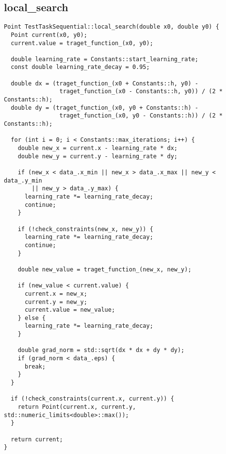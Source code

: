 \documentclass[12pt]{article}
\begin{document}
\subsection{local\_search}
\begin{verbatim}
Point TestTaskSequential::local_search(double x0, double y0) {
  Point current(x0, y0);
  current.value = traget_function_(x0, y0);

  double learning_rate = Constants::start_learning_rate;
  const double learning_rate_decay = 0.95;

  double dx = (traget_function_(x0 + Constants::h, y0) - 
                traget_function_(x0 - Constants::h, y0)) / (2 * Constants::h);
  double dy = (traget_function_(x0, y0 + Constants::h) - 
                traget_function_(x0, y0 - Constants::h)) / (2 * Constants::h);

  for (int i = 0; i < Constants::max_iterations; i++) {
    double new_x = current.x - learning_rate * dx;
    double new_y = current.y - learning_rate * dy;

    if (new_x < data_.x_min || new_x > data_.x_max || new_y < data_.y_min 
        || new_y > data_.y_max) {
      learning_rate *= learning_rate_decay;
      continue;
    }

    if (!check_constraints(new_x, new_y)) {
      learning_rate *= learning_rate_decay;
      continue;
    }

    double new_value = traget_function_(new_x, new_y);

    if (new_value < current.value) {
      current.x = new_x;
      current.y = new_y;
      current.value = new_value;
    } else {
      learning_rate *= learning_rate_decay;
    }

    double grad_norm = std::sqrt(dx * dx + dy * dy);
    if (grad_norm < data_.eps) {
      break;
    }
  }

  if (!check_constraints(current.x, current.y)) {
    return Point(current.x, current.y, std::numeric_limits<double>::max());
  }

  return current;
}
\end{verbatim}
\newpage
\end{document}
